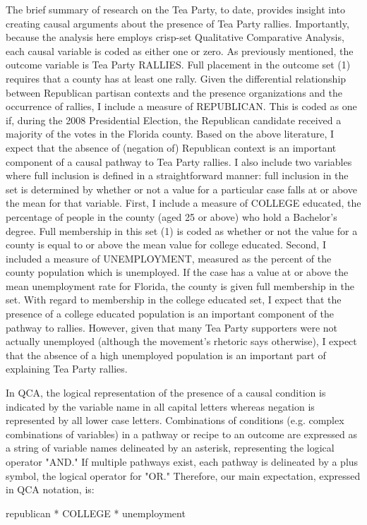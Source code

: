 \documentclass[]{article}
\begin{document}
The brief summary of research on the Tea Party, to date, provides insight into creating causal arguments about the presence of Tea Party rallies. Importantly, because the analysis here employs crisp-set Qualitative Comparative Analysis, each causal variable is coded as either one or zero. As previously mentioned, the outcome variable is Tea Party RALLIES. Full placement in the outcome set (1) requires that a county has at least one rally. Given the differential relationship between Republican partisan contexts and the presence organizations and the occurrence of rallies, I include a measure of REPUBLICAN. This is coded as one if, during the 2008 Presidential Election, the Republican candidate received a majority of the votes in the Florida county. Based on the above literature, I expect that the absence of (negation of) Republican context is an important component of a causal pathway to Tea Party rallies. I also include two variables where full inclusion is defined in a straightforward manner: full inclusion in the set is determined by whether or not a value for a particular case falls at or above the mean for that variable. First, I include a measure of COLLEGE educated, the percentage of people in the county (aged 25 or above) who hold a Bachelor's degree. Full membership in this set (1) is coded as whether or not the value for a county is equal to or above the mean value for college educated. Second, I included a measure of UNEMPLOYMENT, measured as the percent of the county population which is unemployed. If the case has a value at or above the mean unemployment rate for Florida, the county is given full membership in the set. With regard to membership in the college educated set, I expect that the presence of a college educated population is an important component of the pathway to rallies. However, given that many Tea Party supporters were not actually unemployed (although the movement's rhetoric says otherwise), I expect that the absence of a high unemployed population is an important part of explaining Tea Party rallies.

In QCA, the logical representation of the presence of a causal condition is indicated by the variable name in all capital letters whereas negation is represented by all lower case letters. Combinations of conditions (e.g. complex combinations of variables) in a pathway or recipe to an outcome are expressed as a string of variable names delineated by an asterisk, representing the logical operator "AND." If multiple pathways exist, each pathway is delineated by a plus symbol, the logical operator for "OR." Therefore, our main expectation, expressed in QCA notation, is:
\begin{center}
republican * COLLEGE * unemployment
\end{center}
\end{document}
